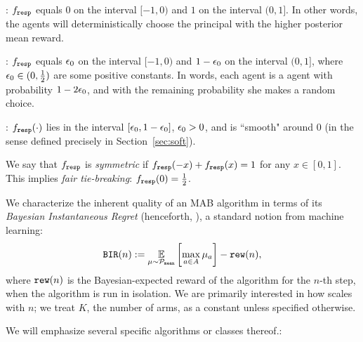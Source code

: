 \begin{OneLiners}
\item \HardMax: $f_{\mathtt{resp}}$ equals $0$ on the interval $[-1,0)$ and $1$
  on the interval $(0,1]$. In other words, the agents will
  deterministically choose the principal with the higher posterior
  mean reward.

\item \HardMaxRandom:
    $f_{\mathtt{resp}}$ equals $\epsilon_0$ on the interval $[-1,0)$ and $1-\epsilon_0$ on the interval $(0,1]$, where $\epsilon_0\in (0,\tfrac12)$ are some positive constants. In words, each agent is a \HardMax agent with probability $1-2\epsilon_0$, and with the remaining probability she makes a random choice.


\item \SoftMaxRandom: $f_{\mathtt{resp}}(\cdot)$ lies in the interval $[\epsilon_0,1-\epsilon_0]$, $\epsilon_0>0$, and is ``smooth" around $0$ (in the sense defined precisely in Section~\ref{sec:soft}).
\end{OneLiners}

We say that $f_{\mathtt{resp}}$ is \emph{symmetric} if $f_{\mathtt{resp}}(-x)+f_{\mathtt{resp}}(x)=1$
for any $x\in [0,1]$. This implies \emph{fair tie-breaking}:
$f_{\mathtt{resp}}(0)=\tfrac12$.%

We characterize the inherent quality of an MAB algorithm in terms of its \emph{Bayesian Instantaneous Regret} (henceforth, \BIR), a standard notion from machine learning:
\begin{align}
\BIR(n) := \E_{\mu\sim\priorMu}
    \left[ \max_{a\in A} \mu_a\right] - \rew(n),
\end{align}
where $\mathtt{rew}(n)$ is the Bayesian-expected reward of the algorithm for the $n$-th step, when the algorithm is run in isolation. We are primarily interested in how \BIR scales with $n$; we treat $K$, the number of arms, as a constant unless specified otherwise.

We will emphasize several specific algorithms or classes thereof.:

